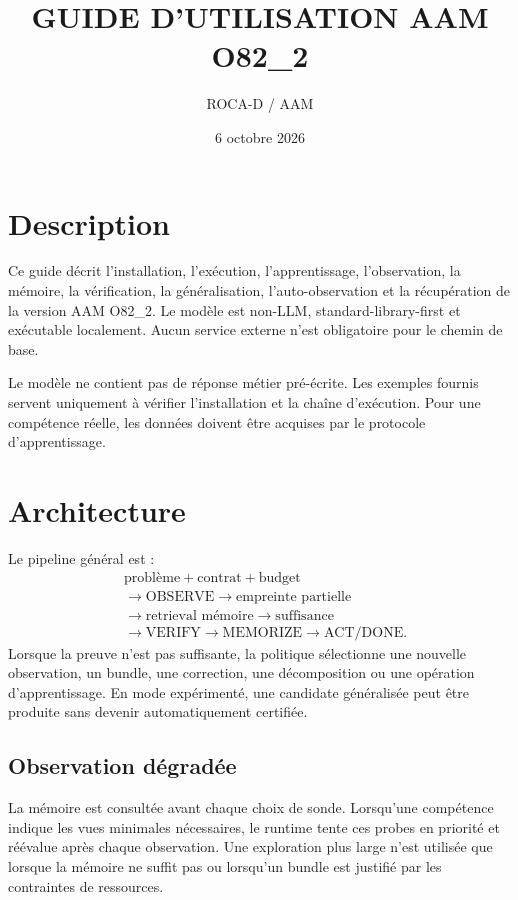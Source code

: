 \documentclass[11pt,a4paper]{report}
\title{GUIDE D'UTILISATION AAM O82\_2}
\author{ROCA-D / AAM}
\date{6 octobre 2026}
\begin{document}
\setlength{\emergencystretch}{2em}
\maketitle
\tableofcontents

\chapter{Description}
Ce guide décrit l'installation, l'exécution, l'apprentissage, l'observation, la mémoire, la vérification, la généralisation, l'auto-observation et la récupération de la version AAM O82\_2. Le modèle est non-LLM, standard-library-first et exécutable localement. Aucun service externe n'est obligatoire pour le chemin de base.

Le modèle ne contient pas de réponse métier pré-écrite. Les exemples fournis servent uniquement à vérifier l'installation et la chaîne d'exécution. Pour une compétence réelle, les données doivent être acquises par le protocole d'apprentissage.

\chapter{Architecture}
Le pipeline général est :
\begin{align*}
&\text{problème}+\text{contrat}+\text{budget}\\
&\rightarrow\text{OBSERVE}\rightarrow\text{empreinte partielle}\\
&\rightarrow\text{retrieval mémoire}\rightarrow\text{suffisance}\\
&\rightarrow\text{VERIFY}\rightarrow\text{MEMORIZE}\rightarrow\text{ACT/DONE}.
\end{align*}
Lorsque la preuve n'est pas suffisante, la politique sélectionne une nouvelle observation, un bundle, une correction, une décomposition ou une opération d'apprentissage. En mode expérimenté, une candidate généralisée peut être produite sans devenir automatiquement certifiée.

\section{Observation dégradée}
La mémoire est consultée avant chaque choix de sonde. Lorsqu'une compétence indique les vues minimales nécessaires, le runtime tente ces probes en priorité et réévalue après chaque observation. Une exploration plus large n'est utilisée que lorsque la mémoire ne suffit pas ou lorsqu'un bundle est justifié par les contraintes de ressources.
\end{document}
